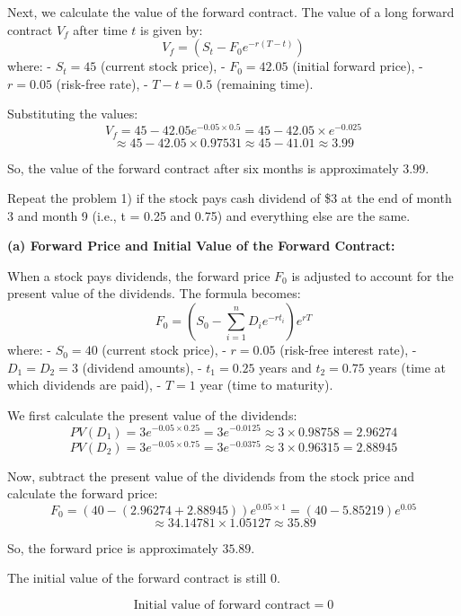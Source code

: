 \documentclass[12pt,letterpaper, onecolumn]{exam}
\begin{document}
\begin{questions}
\begin{solution}
Next, we calculate the value of the forward contract. The value of a long forward contract \( V_f \) after time \( t \) is given by:
\[
V_f = (S_t - F_0 e^{-r(T-t)})
\]
where:
- \( S_t = 45 \) (current stock price),
- \( F_0 = 42.05 \) (initial forward price),
- \( r = 0.05 \) (risk-free rate),
- \( T-t = 0.5 \) (remaining time).

Substituting the values:
\[
V_f = 45 - 42.05 e^{-0.05 \times 0.5} = 45 - 42.05 \times e^{-0.025}\] \[\approx 45 - 42.05 \times 0.97531 \approx 45 - 41.01 \approx 3.99
\]

So, the value of the forward contract after six months is approximately \( 3.99 \).

\end{solution}


    \newpage
    \question Repeat the problem 1) if the stock pays cash dividend of \$3 at the end of month 3 and month 9 (i.e., t = 0.25 and 0.75) and everything else are the same.

    \begin{solution}

\textbf{(a) Forward Price and Initial Value of the Forward Contract:}

When a stock pays dividends, the forward price \( F_0 \) is adjusted to account for the present value of the dividends. The formula becomes:
\[
F_0 = \left(S_0 - \sum_{i=1}^{n} D_i e^{-r t_i} \right) e^{rT}
\]
where:
- \( S_0 = 40 \) (current stock price),
- \( r = 0.05 \) (risk-free interest rate),
- \( D_1 = D_2 = 3 \) (dividend amounts),
- \( t_1 = 0.25 \) years and \( t_2 = 0.75 \) years (time at which dividends are paid),
- \( T = 1 \) year (time to maturity).

We first calculate the present value of the dividends:
\[
PV(D_1) = 3 e^{-0.05 \times 0.25} = 3 e^{-0.0125} \approx 3 \times 0.98758 = 2.96274
\]
\[
PV(D_2) = 3 e^{-0.05 \times 0.75} = 3 e^{-0.0375} \approx 3 \times 0.96315 = 2.88945
\]

Now, subtract the present value of the dividends from the stock price and calculate the forward price:
\[
F_0 = \left(40 - (2.96274 + 2.88945) \right) e^{0.05 \times 1} = \left(40 - 5.85219 \right) e^{0.05} \] \[\approx 34.14781 \times 1.05127 \approx 35.89
\]

So, the forward price is approximately \( 35.89 \).

The initial value of the forward contract is still 0.

\[
\text{Initial value of forward contract} = 0
\]


\end{solution}
\end{questions}
\end{document}
